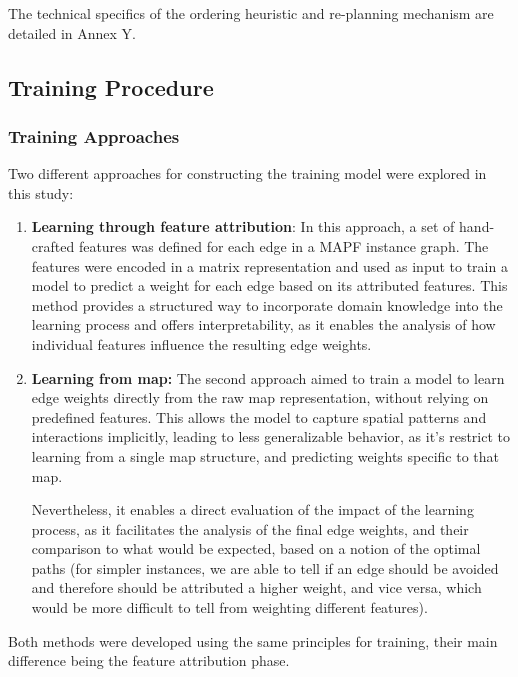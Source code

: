The technical specifics of the ordering heuristic and re-planning mechanism are detailed in Annex Y.

\subsection{Training Procedure}

\subsubsection{Training Approaches}
Two different approaches for constructing the training model were explored in this study:
\begin{enumerate}
    \item \textbf{Learning through feature attribution}:  In this approach, a set of hand-crafted features was defined for each edge in a MAPF instance graph. The features were encoded in a matrix representation and used as input to train a model to predict a weight for each edge based on its attributed features. This method provides a structured way to incorporate domain knowledge into the learning process and offers interpretability, as it enables the analysis of how individual features influence the resulting edge weights.
    \item \textbf{Learning from map: } The second approach aimed to train a model to learn edge weights directly from the raw map representation, without relying on predefined features. This allows the model to capture spatial patterns and interactions implicitly, leading to less generalizable behavior, as it's restrict to learning from a single map structure, and predicting weights specific to that map. 
    
    Nevertheless, it enables a direct evaluation of the impact of the learning process, as it facilitates the analysis of the final edge weights, and their comparison to what would be expected, based on a notion of the optimal paths (for simpler instances, we are able to tell if an edge should be avoided and therefore should be attributed a higher weight, and vice versa, which would be more difficult to tell from weighting different features).
\end{enumerate}
Both methods were developed using the same principles for training, their main difference being the feature attribution phase.

